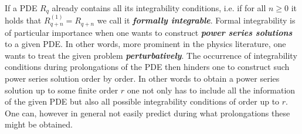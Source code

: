 \documentclass[a4paper,12pt, DIV=14, BCOR=5mm, twoside, headsepline, numbers=noenddot]{scrbook}
\begin{document}
If a PDE $R_q$ already contains all its integrability conditions, i.e. if for all $n\geq 0$ it holds that $R_{q+n}^{(1)} = R_{q+n}$ we call it \textit{\textbf{formally integrable}}.
Formal integrability is of particular importance when one wants to construct \textbf{\textit{power series solutions}} to a given PDE. In other words, more prominent in the physics literature, one wants to treat the given problem \textit{\textbf{perturbatively}}. The occurrence of integrability conditions during prolongations of the PDE then hinders one to construct such power series solution order by order. In other words to obtain a power series solution up to some finite order $r$ one not only has to include all the information of the given PDE but also all possible integrability conditions of order up to $r$. One can, however in general not easily predict during what prolongations these might be obtained. 
\end{document}
